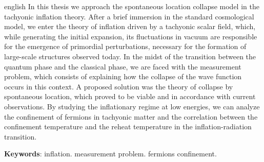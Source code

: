 \documentclass[
	12pt,				%
	openright,			%
	oneside,			%
	a4paper,			%
	english,			%
	french,				%
	spanish,			%
	brazil				%
	]{abntex2}
\begin{document}
\begin{resumo}[Abstract]
 \begin{otherlanguage*}{english}
   In this thesis we approach the spontaneous location collapse model in the tachyonic inflation theory. After a brief immersion in the standard cosmological model, we enter the theory of inflation driven by a tachyonic scalar field, which, while generating the initial expansion, its fluctuations in vacuum are responsible for the emergence of primordial perturbations, necessary for the formation of large-scale structures observed today. In the midst of the transition between the quantum phase and the classical phase, we are faced with the measurement problem, which consists of explaining how the collapse of the wave function occurs in this context. A proposed solution was the theory of collapse by spontaneous location, which proved to be viable and in accordance with current observations. By studying the inflationary regime at low energies, we can analyze the confinement of fermions in tachyonic matter and the correlation between the confinement temperature and the reheat temperature in the inflation-radiation transition.

   \vspace{\onelineskip}
 
   \noindent 
   \textbf{Keywords}: inflation. measurement problem. fermions confinement.
 \end{otherlanguage*}
\end{resumo}

% 
%
%  

\listoffigures*
\cleardoublepage

\end{document}
